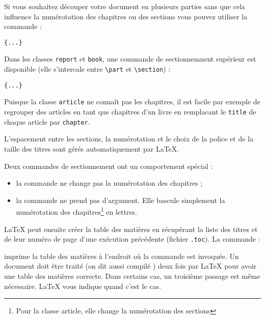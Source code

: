 Si vous souhaitez découper votre document en plusieurs parties sans que cela influence la
numérotation des chapitres ou des sections vous pouvez utiliser la
commande :
\begin{lscommand}
\verb|{...}|
\end{lscommand}

Dans les classes \texttt{report} et \texttt{book}, une commande de
sectionnemnent supérieur est disponible (elle s'intercale
entre \verb|\part| et \verb|\section|) :
\begin{lscommand}
\verb|{...}|
\end{lscommand}

Puisque la classe \texttt{article} ne connaît pas les chapitres, il
est facile par exemple de regrouper des articles en tant que chapitres
d'un livre en remplacant le \texttt{\bs title} de chaque article par
\texttt{\bs chapter}.

L'espacement entre les sections, la numérotation et le
choix de la police et de la taille des titres sont gérés
automatiquement par \LaTeX{}.

Deux commandes de sectionnement ont un comportement spécial :
\begin{itemize}
\item la commande  ne change pas la numérotation des
      chapitres ;
\item la commande  ne prend pas d'argument. Elle bascule
      simplement la numérotation des chapitres\footnote{Pour la classe
      article, elle change la numérotation des sections} en lettres.
\end{itemize}

\LaTeX{} peut ensuite créer la table des matières en récupérant la
liste des titres et de leur numéro de page d'une exécution précédente
(fichier \texttt{.toc}). La commande :
\begin{lscommand}
\end{lscommand}
\noindent imprime la table des matières à l'endroit où la commande est
invoquée. Un document doit être traité (on dit aussi \og compilé
\fg{}) deux fois par \LaTeX{} pour avoir une table des matières
correcte. Dans certains cas, un troisième passage est même
nécessaire. \LaTeX{} vous indique quand c'est le cas.

